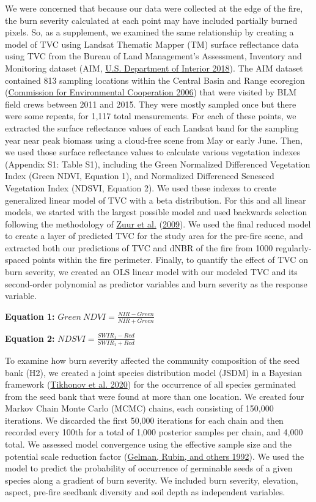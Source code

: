 \documentclass[
  12pt,
]{article}
\begin{document}
We were concerned that because our data were collected at the edge of
the fire, the burn severity calculated at each point may have included
partially burned pixels. So, as a supplement, we examined the same
relationship by creating a model of TVC using Landsat Thematic Mapper
(TM) surface reflectance data using TVC from the Bureau of Land
Management's Assessment, Inventory and Monitoring dataset (AIM,
\protect\hyperlink{ref-AIM}{U.S. Department of Interior 2018}). The AIM
dataset contained 813 sampling locations within the Central Basin and
Range ecoregion (\protect\hyperlink{ref-CEC2006}{Commission for
Environmental Cooperation 2006}) that were visited by BLM field crews
between 2011 and 2015. They were mostly sampled once but there were some
repeats, for 1,117 total measurements. For each of these points, we
extracted the surface reflectance values of each Landsat band for the
sampling year near peak biomass using a cloud-free scene from May or
early June. Then, we used those surface reflectance values to calculate
various vegetation indexes (Appendix S1: Table S1), including the Green
Normalized Differenced Vegetation Index (Green NDVI, Equation 1), and
Normalized Differenced Senesced Vegetation Index (NDSVI, Equation 2). We
used these indexes to create generalized linear model of TVC with a beta
distribution. For this and all linear models, we started with the
largest possible model and used backwards selection following the
methodology of \protect\hyperlink{ref-Zuur2009}{Zuur et al.}
(\protect\hyperlink{ref-Zuur2009}{2009}). We used the final reduced
model to create a layer of predicted TVC for the study area for the
pre-fire scene, and extracted both our predictions of TVC and dNBR of
the fire from 1000 regularly-spaced points within the fire perimeter.
Finally, to quantify the effect of TVC on burn severity, we created an
OLS linear model with our modeled TVC and its second-order polynomial as
predictor variables and burn severity as the response variable.

\textbf{Equation 1:} \(Green~NDVI = \frac{NIR - Green}{NIR + Green}\)

\textbf{Equation 2:} \(NDSVI = \frac{SWIR_1 - Red}{SWIR_1 + Red}\)

To examine how burn severity affected the community composition of the
seed bank (H2), we created a joint species distribution model (JSDM) in
a Bayesian framework (\protect\hyperlink{ref-HMSC}{Tikhonov et al.
2020}) for the occurrence of all species germinated from the seed bank
that were found at more than one location. We created four Markov Chain
Monte Carlo (MCMC) chains, each consisting of 150,000 iterations. We
discarded the first 50,000 iterations for each chain and then recorded
every 100th for a total of 1,000 posterior samples per chain, and 4,000
total. We assessed model convergence using the effective sample size and
the potential scale reduction factor
(\protect\hyperlink{ref-Gelman1992}{Gelman, Rubin, and others 1992}). We
used the model to predict the probability of occurrence of germinable
seeds of a given species along a gradient of burn severity. We included
burn severity, elevation, aspect, pre-fire seedbank diversity and soil
depth as independent variables.
\end{document}
